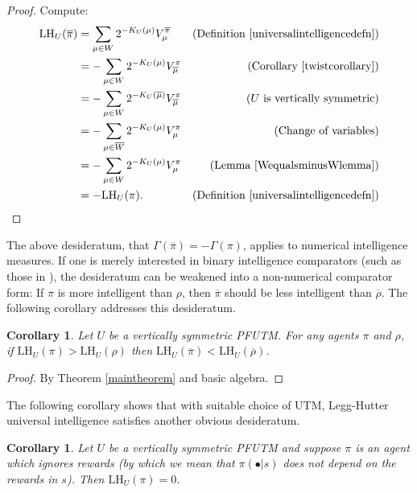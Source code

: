 \documentclass{article}
\newtheorem{corollary}[theorem]{Corollary}
\def\LH{\textrm{LH}}
\begin{document}
\begin{proof}
    Compute:
    \begin{align*}
        \LH_U(\overline\pi) &= \sum_{\mu\in W} 2^{-K_U(\mu)}V^{\overline\pi}_\mu
            &\mbox{(Definition \ref{universalintelligencedefn})}\\
          &= -\sum_{\mu\in W} 2^{-K_U(\mu)}V^\pi_{\overline\mu}
            &\mbox{(Corollary \ref{twistcorollary})}\\
          &= -\sum_{\mu\in W} 2^{-K_U(\overline\mu)}V^\pi_{\overline\mu}
            &\mbox{($U$ is vertically symmetric)}\\
          &= -\sum_{\mu\in \overline W} 2^{-K_U(\mu)}V^\pi_\mu
            &\mbox{(Change of variables)}\\
          &= -\sum_{\mu\in W} 2^{-K_U(\mu)}V^\pi_\mu
            &\mbox{(Lemma \ref{WequalsminusWlemma})}\\
          &= -\LH_{U}(\pi).
            &\mbox{(Definition \ref{universalintelligencedefn})}
    \end{align*}
\end{proof}

The above desideratum, that $\Gamma(\overline\pi)=-\Gamma(\pi)$, applies to
numerical intelligence measures. If one is merely interested in binary
intelligence comparators (such as those in \cite{alexander2019intelligence}),
the desideratum can be weakened into a non-numerical comparator form:
    If $\pi$ is more intelligent than $\rho$,
    then $\overline\pi$ should be less intelligent than $\overline\rho$.
The following corollary addresses this desideratum.

\begin{corollary}
\label{comparatorcorollary}
    Let $U$ be a vertically symmetric PFUTM.
    For any agents $\pi$ and $\rho$, if $\LH_U(\pi)>\LH_U(\rho)$
    then $\LH_U(\overline\pi)<\LH_U(\overline\rho)$.
\end{corollary}

\begin{proof}
    By Theorem \ref{maintheorem} and basic algebra.
\end{proof}

The following corollary shows that with suitable choice of UTM,
Legg-Hutter universal intelligence satisfies another obvious desideratum.

\begin{corollary}
\label{ignoringrewardscorollary}
    Let $U$ be a vertically symmetric PFUTM and
    suppose $\pi$ is an agent which ignores rewards (by which we mean that
    $\pi(\bullet|s)$ does not depend on the rewards in $s$).
    Then $\LH_U(\pi)=0$.
\end{corollary}
\end{document}
